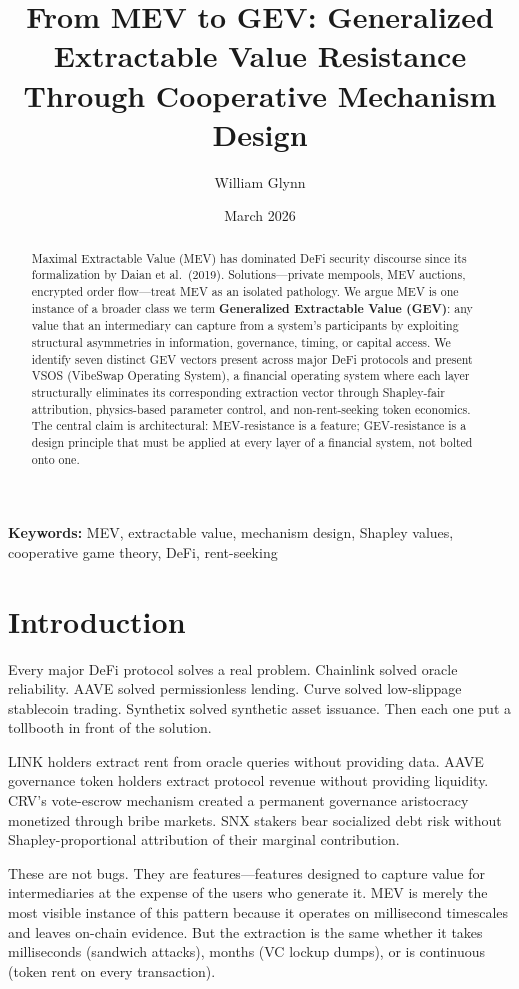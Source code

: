 \documentclass[11pt, a4paper]{article}
\title{\textbf{From MEV to GEV: Generalized Extractable Value Resistance\\Through Cooperative Mechanism Design}}
\author[1]{William Glynn}
\affil[1]{VibeSwap --- Independent Research}
\date{March 2026}
\begin{document}
\maketitle

\begin{abstract}
Maximal Extractable Value (MEV) has dominated DeFi security discourse since its formalization by Daian et al.\ (2019). Solutions---private mempools, MEV auctions, encrypted order flow---treat MEV as an isolated pathology. We argue MEV is one instance of a broader class we term \textbf{Generalized Extractable Value (GEV)}: any value that an intermediary can capture from a system's participants by exploiting structural asymmetries in information, governance, timing, or capital access. We identify seven distinct GEV vectors present across major DeFi protocols and present VSOS (VibeSwap Operating System), a financial operating system where each layer structurally eliminates its corresponding extraction vector through Shapley-fair attribution, physics-based parameter control, and non-rent-seeking token economics. The central claim is architectural: MEV-resistance is a feature; GEV-resistance is a design principle that must be applied at every layer of a financial system, not bolted onto one.
\end{abstract}

\noindent\textbf{Keywords:} MEV, extractable value, mechanism design, Shapley values, cooperative game theory, DeFi, rent-seeking

\section{Introduction}

Every major DeFi protocol solves a real problem. Chainlink solved oracle reliability. AAVE solved permissionless lending. Curve solved low-slippage stablecoin trading. Synthetix solved synthetic asset issuance. Then each one put a tollbooth in front of the solution.

LINK holders extract rent from oracle queries without providing data. AAVE governance token holders extract protocol revenue without providing liquidity. CRV's vote-escrow mechanism created a permanent governance aristocracy monetized through bribe markets. SNX stakers bear socialized debt risk without Shapley-proportional attribution of their marginal contribution.

These are not bugs. They are features---features designed to capture value for intermediaries at the expense of the users who generate it. MEV is merely the most visible instance of this pattern because it operates on millisecond timescales and leaves on-chain evidence. But the extraction is the same whether it takes milliseconds (sandwich attacks), months (VC lockup dumps), or is continuous (token rent on every transaction).
\end{document}
